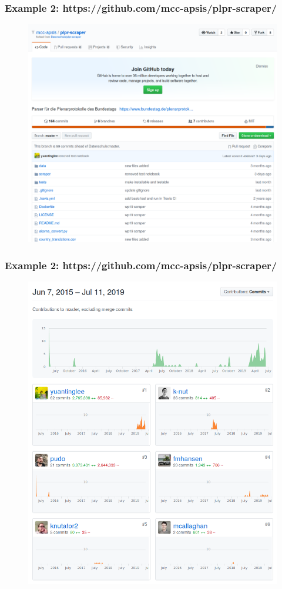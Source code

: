 \documentclass{beamer}
\begin{document}
\begin{frame}
\frametitle{Example 2: https://github.com/mcc-apsis/plpr-scraper/}

\begin{figure}
	\includegraphics[width=0.95\linewidth]{images/plpr-scraper1.png}
\end{figure}

\end{frame}


\begin{frame}
\frametitle{Example 2: https://github.com/mcc-apsis/plpr-scraper/}

\begin{figure}
	\includegraphics[width=0.75\linewidth]{images/plpr-scraper3.png}
\end{figure}

\end{frame}
\end{document}
